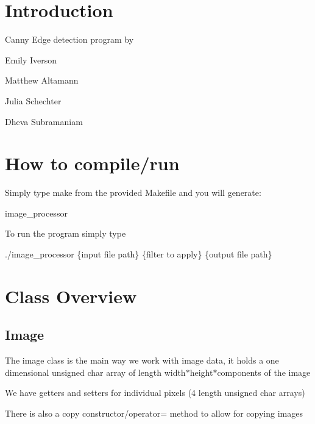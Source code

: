 \hypertarget{index_intro_sec}{}\section{Introduction}\label{index_intro_sec}
Canny Edge detection program by

Emily Iverson

Matthew Altamann

Julia Schechter

Dheva Subramaniam\hypertarget{index_how_to_make}{}\section{How to compile/run}\label{index_how_to_make}
Simply type make from the provided Makefile and you will generate\+:

image\+\_\+processor

To run the program simply type

./image\+\_\+processor \{input file path\} \{filter to apply\} \{output file path\}\hypertarget{index_class_overview}{}\section{Class Overview}\label{index_class_overview}
\hypertarget{index_autotoc_md0}{}\subsection{Image}\label{index_autotoc_md0}
The image class is the main way we work with image data, it holds a one dimensional unsigned char array of length width$\ast$height$\ast$components of the image

We have getters and setters for individual pixels (4 length unsigned char arrays)

There is also a copy constructor/operator= method to allow for copying images

